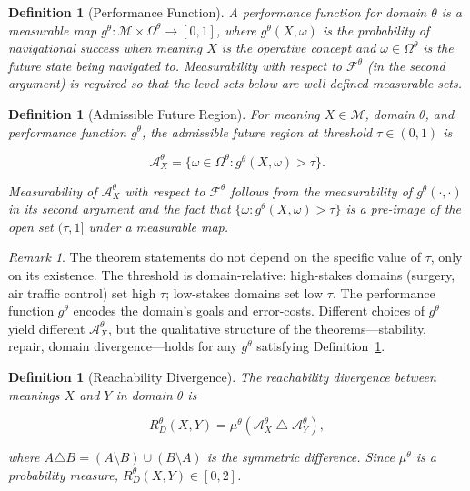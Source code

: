 \documentclass[12pt]{article}
\theoremstyle{rthm}
\theoremstyle{rdef}
\newtheorem{definition}[theorem]{Definition}
\theoremstyle{remark}
\newtheorem*{remark}{Remark}
\newcommand{\M}{\mathcal{M}}
\newcommand{\A}{\mathcal{A}}
\newcommand{\Om}{\Omega}
\newcommand{\RD}[1][\theta]{R_{D}^{#1}}
\begin{document}
\begin{definition}[Performance Function]
\label{def:perf}
A \emph{performance function} for domain $\theta$ is a measurable map
$g^{\theta} : \M \times \Om^{\theta} \to [0,1]$, where $g^{\theta}(X, \omega)$
is the probability of navigational success when meaning $X$ is the operative
concept and $\omega \in \Om^{\theta}$ is the future state being navigated to.
Measurability with respect to $\mathcal{F}^{\theta}$ (in the second argument)
is required so that the level sets below are well-defined measurable sets.
\end{definition}

\begin{definition}[Admissible Future Region]
\label{def:afr}
For meaning $X \in \M$, domain $\theta$, and performance function $g^{\theta}$,
the \emph{admissible future region} at threshold $\tau \in (0,1)$ is

\[
\A_X^{\theta} = \bigl\{\omega \in \Om^{\theta} : g^{\theta}(X, \omega) > \tau \bigr\}.
\]

Measurability of $\A_X^{\theta}$ with respect to $\mathcal{F}^{\theta}$ follows
from the measurability of $g^{\theta}(\cdot, \cdot)$ in its second argument and
the fact that $\{\omega : g^{\theta}(X,\omega) > \tau\}$ is a pre-image of the
open set $(\tau, 1]$ under a measurable map.
\end{definition}

\begin{remark}
The theorem statements do not depend on the specific value of $\tau$, only on
its existence. The threshold is domain-relative: high-stakes domains (surgery,
air traffic control) set high $\tau$; low-stakes domains set low $\tau$. The
performance function $g^{\theta}$ encodes the domain's goals and error-costs.
Different choices of $g^{\theta}$ yield different $\A_X^{\theta}$, but the
qualitative structure of the theorems---stability, repair, domain
divergence---holds for any $g^{\theta}$ satisfying Definition~\ref{def:perf}.
\end{remark}

\begin{definition}[Reachability Divergence]
\label{def:rd}
The \emph{reachability divergence} between meanings $X$ and $Y$ in domain
$\theta$ is

\[
\RD(X,Y) = \mu^{\theta}\!\left(\A_X^{\theta} \;\triangle\; \A_Y^{\theta}\right),
\]

where $A \triangle B = (A \setminus B) \cup (B \setminus A)$ is the symmetric
difference. Since $\mu^{\theta}$ is a probability measure, $\RD(X,Y) \in [0,2]$.
\end{definition}
\end{document}
